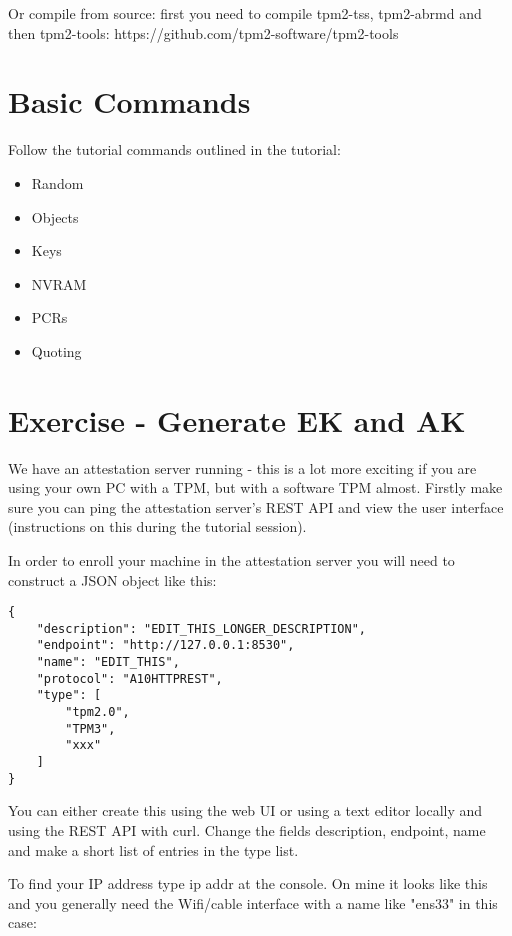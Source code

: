 \documentclass[10pt,a4paper]{article}
\begin{document}
Or compile from source: first you need to compile tpm2-tss, tpm2-abrmd and then tpm2-tools: https://github.com/tpm2-software/tpm2-tools

\section{Basic Commands}

Follow the tutorial commands outlined in the tutorial:

\begin{itemize}
 \item Random
 \item Objects
\item Keys
\item NVRAM
\item PCRs
\item Quoting
\end{itemize}

\section{Exercise - Generate EK and AK}

We have an attestation server running - this is a lot more exciting if you are using your own PC with a TPM, but with a software TPM almost.  Firstly make sure you can ping the attestation server's REST API and view the user interface (instructions on this during the tutorial session).

In order to enroll your machine in the attestation server you will need to construct a JSON object like this:

\begin{verbatim}
{
    "description": "EDIT_THIS_LONGER_DESCRIPTION",
    "endpoint": "http://127.0.0.1:8530",
    "name": "EDIT_THIS",
    "protocol": "A10HTTPREST",
    "type": [
        "tpm2.0",
        "TPM3",
        "xxx"
    ]
}
\end{verbatim}

You can either create this using the web UI or using a text editor locally and using the REST API with curl. Change the fields description, endpoint, name and make a short list of entries in the type list.

To find your IP address type ip addr at the console. On mine it looks like this and you generally need the Wifi/cable interface with a name like "ens33" in this case:
\end{document}
